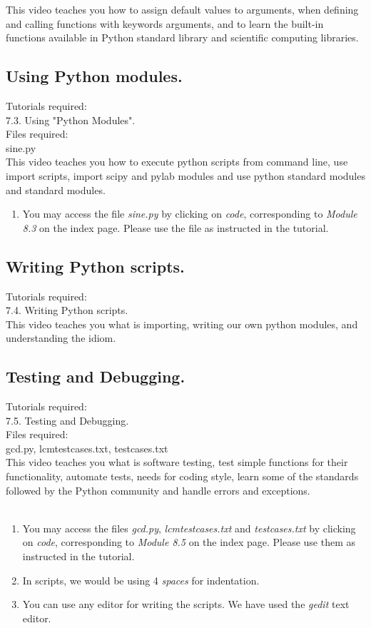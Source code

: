 \documentclass[11pt,twocolumn]{article}
\newenvironment{enumcpt}{\begin{enumerate} \topsep 0pt \partopsep 0pt 
                        \parsep 0pt
                        \itemsep 0pt \leftmargin -1in \rightmargin 0pt
                        }{\end{enumerate}}
\begin{document}
This video teaches you how to assign default values to arguments, when defining and calling functions with keywords arguments, and to learn the built-in functions available in Python standard  library and scientific computing libraries. 
\subsection{Using Python modules.}
 Tutorials required: \\ 7.3. Using "Python Modules". \\
 Files required: \\sine.py \\
This video teaches you how to execute python scripts from command line, use import scripts, import scipy and pylab modules and use python standard modules and standard modules.
\begin{enumcpt}
\item You may access the file  \emph{sine.py} by clicking on \emph{code}, corresponding to \emph{Module 8.3} on the index page. Please use the file as instructed in the tutorial. 
\end{enumcpt}

\subsection{Writing Python scripts.}
Tutorials required: \\ 7.4. Writing Python scripts. \\
This video teaches you what is importing, writing our own python modules, and understanding the idiom.
\subsection{Testing and Debugging.}
Tutorials required: \\ 7.5. Testing and Debugging. \\
Files required: \\gcd.py, lcmtestcases.txt, testcases.txt \\
This video teaches you what is software testing, test simple functions for their functionality, automate tests, needs for coding style, learn some of the standards followed by the Python community and handle errors and exceptions. \\ \\
\begin{enumcpt}
\item You may access the files \emph{gcd.py}, \emph{lcmtestcases.txt} and \emph{testcases.txt}  by clicking on \emph{code}, corresponding to \emph{Module 8.5} on the index page. Please use them as instructed in the tutorial. 
\item In scripts, we would be using 4 \emph{spaces} for indentation.
\item You can use any editor for writing the scripts. We have used the \emph{gedit} text editor.
\end{enumcpt}
\end{document}
